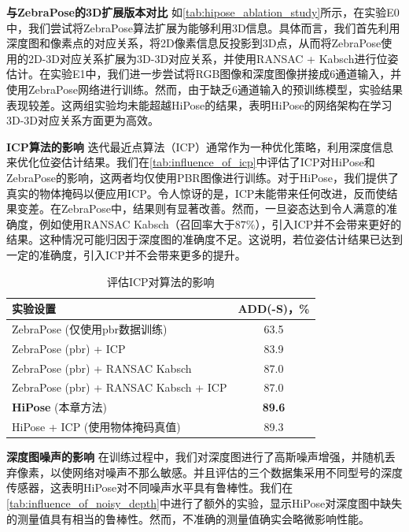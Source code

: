 \textbf{与ZebraPose的3D扩展版本对比 }
如\autoref{tab:hipose_ablation_study}所示，在实验E0中，我们尝试将ZebraPose算法扩展为能够利用3D信息。具体而言，我们首先利用深度图和像素点的对应关系，将2D像素信息反投影到3D点，从而将ZebraPose使用的2D-3D对应关系扩展为3D-3D对应关系，并使用RANSAC + Kabsch进行位姿估计。在实验E1中，我们进一步尝试将RGB图像和深度图像拼接成6通道输入，并使用ZebraPose网络进行训练。然而，由于缺乏6通道输入的预训练模型，实验结果表现较差。这两组实验均未能超越HiPose的结果，表明HiPose的网络架构在学习3D-3D对应关系方面更为高效。

\textbf{ICP算法的影响 }
迭代最近点算法（ICP）通常作为一种优化策略，利用深度信息来优化位姿估计结果。我们在\autoref{tab:influence_of_icp}中评估了ICP对HiPose和ZebraPose的影响，这两者均仅使用PBR图像进行训练。对于HiPose，我们提供了真实的物体掩码以便应用ICP。令人惊讶的是，ICP未能带来任何改进，反而使结果变差。在ZebraPose中，结果则有显著改善。然而，一旦姿态达到令人满意的准确度，例如使用RANSAC Kabsch（召回率大于$87\%$），引入ICP并不会带来更好的结果。这种情况可能归因于深度图的准确度不足。这说明，若位姿估计结果已达到一定的准确度，引入ICP并不会带来更多的提升。

\begin{table}[h]
    \centering
    \begin{tabular}{@{}l|c@{}}
      \toprule
      实验设置 & ADD(-S)，\% \\
      \midrule
      ZebraPose (仅使用pbr数据训练) & 63.5\\
      ZebraPose (pbr) + ICP & 83.9\\
      ZebraPose (pbr) + RANSAC Kabsch & 87.0\\
      ZebraPose (pbr) + RANSAC Kabsch + ICP & 87.0\\
      \midrule
      \textbf{HiPose} (本章方法) &  \textbf{89.6}\\
      HiPose + ICP (使用物体掩码真值) &  89.3\\
      \bottomrule
    \end{tabular}
    \caption{评估ICP对算法的影响}
    \label{tab:influence_of_icp}
  \end{table}

\textbf{深度图噪声的影响 }
在训练过程中，我们对深度图进行了高斯噪声增强，并随机丢弃像素，以使网络对噪声不那么敏感。并且评估的三个数据集采用不同型号的深度传感器，这表明HiPose对不同噪声水平具有鲁棒性。我们在\autoref{tab:influence_of_noisy_depth}中进行了额外的实验，显示HiPose对深度图中缺失的测量值具有相当的鲁棒性。然而，不准确的测量值确实会略微影响性能。

